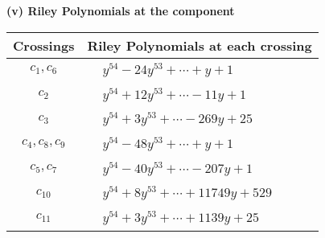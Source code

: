 \documentclass[1p]{elsarticle_modified}
\theoremstyle{definition}
\begin{document}
\newpage\renewcommand{\arraystretch}{1}
\flushleft \textbf{(v) Riley Polynomials at the component}\newline \\
\begin{tabular}{m{50pt}|m{274pt}}
Crossings & \hspace{64pt}Riley Polynomials at each crossing \\
\hline $$\begin{aligned}c_{1},c_{6}\end{aligned}$$&$\begin{aligned}
&y^{54}-24 y^{53}+\cdots+y+1
\end{aligned}$\\
\hline $$\begin{aligned}c_{2}\end{aligned}$$&$\begin{aligned}
&y^{54}+12 y^{53}+\cdots-11 y+1
\end{aligned}$\\
\hline $$\begin{aligned}c_{3}\end{aligned}$$&$\begin{aligned}
&y^{54}+3 y^{53}+\cdots-269 y+25
\end{aligned}$\\
\hline $$\begin{aligned}c_{4},c_{8},c_{9}\end{aligned}$$&$\begin{aligned}
&y^{54}-48 y^{53}+\cdots+y+1
\end{aligned}$\\
\hline $$\begin{aligned}c_{5},c_{7}\end{aligned}$$&$\begin{aligned}
&y^{54}-40 y^{53}+\cdots-207 y+1
\end{aligned}$\\
\hline $$\begin{aligned}c_{10}\end{aligned}$$&$\begin{aligned}
&y^{54}+8 y^{53}+\cdots+11749 y+529
\end{aligned}$\\
\hline $$\begin{aligned}c_{11}\end{aligned}$$&$\begin{aligned}
&y^{54}+3 y^{53}+\cdots+1139 y+25
\end{aligned}$\\
\hline
\end{tabular}\\~\\
\end{document}
